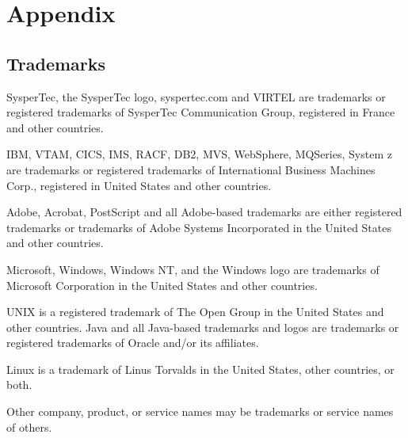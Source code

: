 \documentclass[letterpaper,10pt,english]{sphinxmanual}
\begin{document}
\chapter{Appendix}
\label{\detokenize{connectivity_guide:appendix}}

\section{Trademarks}
\label{\detokenize{connectivity_guide:trademarks}}
SysperTec, the SysperTec logo, syspertec.com and VIRTEL are trademarks or registered trademarks of SysperTec
Communication Group, registered in France and other countries.

IBM, VTAM, CICS, IMS, RACF, DB2, MVS, WebSphere, MQSeries, System z are trademarks or registered trademarks of
International Business Machines Corp., registered in United States and other countries.

Adobe, Acrobat, PostScript and all Adobe-based trademarks are either registered trademarks or trademarks of Adobe
Systems Incorporated in the United States and other countries.

Microsoft, Windows, Windows NT, and the Windows logo are trademarks of Microsoft Corporation in the United States
and other countries.

UNIX is a registered trademark of The Open Group in the United States and other countries.
Java and all Java-based trademarks and logos are trademarks or registered trademarks of Oracle and/or its affiliates.

Linux is a trademark of Linus Torvalds in the United States, other countries, or both.

Other company, product, or service names may be trademarks or service names of others.



\renewcommand{\indexname}{Index}
\printindex
\end{document}
